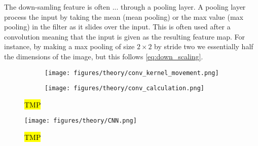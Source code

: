 The down-samling feature is
often ... through a pooling layer. A pooling layer process the input by taking
the mean (mean pooling) or the max value (max pooling) in the filter as it
slides over the input. This is often used after a convolution meaning that the
input is given as the resulting feature map. For instance, by making a max
pooling of size $2 \times 2$ by stride two we essentially half the dimensions of
the image, but this follows \cref{eq:down_scaling}. 



\begin{figure}[H]
  \centering
  \begin{subfigure}[t]{0.26\textwidth}
    \centering
    \texttt{[image: figures/theory/conv\_kernel\_movement.png]}
    \caption{}
  \end{subfigure}
  \hfill
  \begin{subfigure}[t]{0.70\textwidth}
    \centering
    \texttt{[image: figures/theory/conv\_calculation.png]}
    \caption{}
    \label{fig:conv_calculation}
  \end{subfigure}
  \hfill
  \caption{\hl{TMP}}
  \label{fig:conv_example}
\end{figure}

\begin{figure}[H]
  \centering
  \texttt{[image: figures/theory/CNN.png]}
  \caption{\hl{TMP}}
  \label{fig:CNN}
\end{figure}


